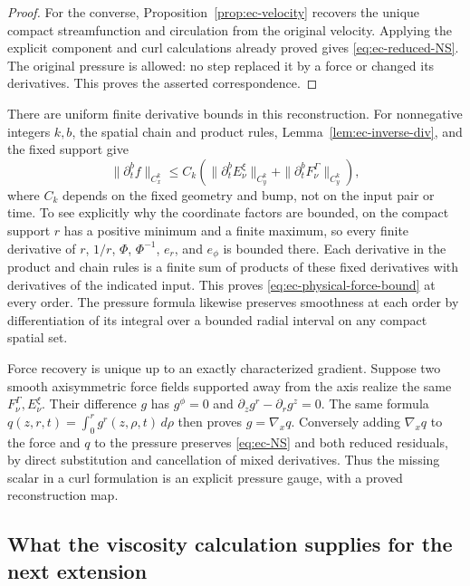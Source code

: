 \begin{proof}
For the converse, Proposition~\ref{prop:ec-velocity} recovers the
unique compact streamfunction and circulation from the original
velocity.  Applying the explicit component and curl calculations
already proved gives \eqref{eq:ec-reduced-NS}.  The original pressure
is allowed: no step replaced it by a force or changed its derivatives.
This proves the asserted correspondence.
\end{proof}

There are uniform finite derivative bounds in this reconstruction.
For nonnegative integers \(k,b\), the spatial chain and product rules,
Lemma~\ref{lem:ec-inverse-div}, and the fixed support give
\begin{equation}
 \|\partial_t^b f\|_{C_x^k}
 \leq C_k\left(
       \|\partial_t^b E_\nu^\xi\|_{C_y^k}
      +\|\partial_t^b F_\nu^\Gamma\|_{C_y^k}\right),
 \label{eq:ec-physical-force-bound}
\end{equation}
where \(C_k\) depends on the fixed geometry and bump, not on the
input pair or time.  To see explicitly why the coordinate factors are
bounded, on the compact support \(r\) has a positive minimum and a
finite maximum, so every finite derivative of \(r\), \(1/r\),
\(\Phi\), \(\Phi^{-1}\), \(e_r\), and \(e_\phi\) is bounded there.
Each derivative in the product and chain rules is a finite sum of
products of these fixed derivatives with derivatives of the indicated
input.  This proves \eqref{eq:ec-physical-force-bound} at every order.
The pressure formula likewise preserves smoothness at each order by
differentiation of its integral over a bounded radial interval on any
compact spatial set.

Force recovery is unique up to an exactly characterized gradient.
Suppose two smooth axisymmetric force fields supported away from the
axis realize the same \(F_\nu^\Gamma,E_\nu^\xi\).  Their difference
\(g\) has \(g^\phi=0\) and
\(\partial_zg^r-\partial_rg^z=0\).  The same formula
\(q(z,r,t)=\int_0^r g^r(z,\rho,t)\,d\rho\) then proves
\(g=\nabla_xq\).  Conversely adding \(\nabla_xq\) to the force and
\(q\) to the pressure preserves \eqref{eq:ec-NS} and both reduced
residuals, by direct substitution and cancellation of mixed
derivatives.  Thus the missing scalar in a curl formulation is an
explicit pressure gauge, with a proved reconstruction map.

\subsection{What the viscosity calculation supplies for the next extension}

